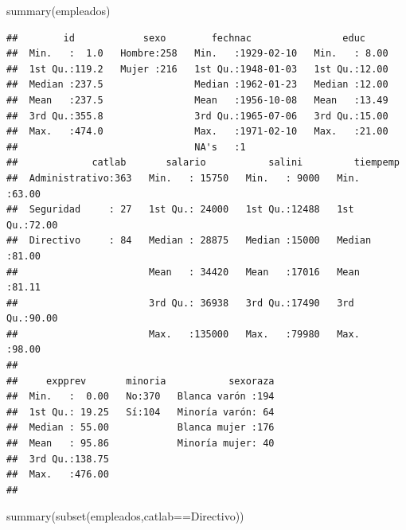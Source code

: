 \documentclass[
]{book}
\newenvironment{Shaded}{\begin{snugshade}}{\end{snugshade}}
\newcommand{\FunctionTok}[1]{\textcolor[rgb]{0.00,0.00,0.00}{#1}}
\newcommand{\NormalTok}[1]{#1}
\newcommand{\SpecialCharTok}[1]{\textcolor[rgb]{0.00,0.00,0.00}{#1}}
\newcommand{\StringTok}[1]{\textcolor[rgb]{0.31,0.60,0.02}{#1}}
\theoremstyle{break}
\theoremstyle{nonumberplain}
\begin{document}
\begin{Shaded}
\begin{Highlighting}[]
\FunctionTok{summary}\NormalTok{(empleados)}
\end{Highlighting}
\end{Shaded}

\begin{verbatim}
##        id            sexo        fechnac                educ      
##  Min.   :  1.0   Hombre:258   Min.   :1929-02-10   Min.   : 8.00  
##  1st Qu.:119.2   Mujer :216   1st Qu.:1948-01-03   1st Qu.:12.00  
##  Median :237.5                Median :1962-01-23   Median :12.00  
##  Mean   :237.5                Mean   :1956-10-08   Mean   :13.49  
##  3rd Qu.:355.8                3rd Qu.:1965-07-06   3rd Qu.:15.00  
##  Max.   :474.0                Max.   :1971-02-10   Max.   :21.00  
##                               NA's   :1                           
##             catlab       salario           salini         tiempemp    
##  Administrativo:363   Min.   : 15750   Min.   : 9000   Min.   :63.00  
##  Seguridad     : 27   1st Qu.: 24000   1st Qu.:12488   1st Qu.:72.00  
##  Directivo     : 84   Median : 28875   Median :15000   Median :81.00  
##                       Mean   : 34420   Mean   :17016   Mean   :81.11  
##                       3rd Qu.: 36938   3rd Qu.:17490   3rd Qu.:90.00  
##                       Max.   :135000   Max.   :79980   Max.   :98.00  
##                                                                       
##     expprev       minoria           sexoraza  
##  Min.   :  0.00   No:370   Blanca varón :194  
##  1st Qu.: 19.25   Sí:104   Minoría varón: 64  
##  Median : 55.00            Blanca mujer :176  
##  Mean   : 95.86            Minoría mujer: 40  
##  3rd Qu.:138.75                               
##  Max.   :476.00                               
## 
\end{verbatim}

\begin{Shaded}
\begin{Highlighting}[]
\FunctionTok{summary}\NormalTok{(}\FunctionTok{subset}\NormalTok{(empleados,catlab}\SpecialCharTok{==}\StringTok{\textquotesingle{}Directivo\textquotesingle{}}\NormalTok{))}
\end{Highlighting}
\end{Shaded}
\end{document}
